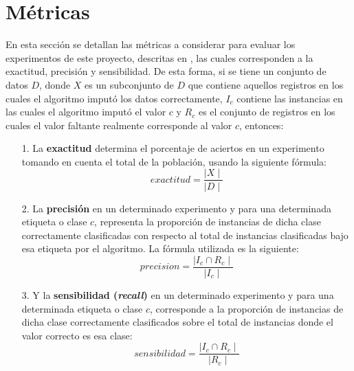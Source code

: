 \section{Métricas}\label{metrics-section}
En esta sección se detallan las métricas a considerar para evaluar los experimentos de este proyecto, descritas en \cite{wang2016non}, las cuales corresponden a la exactitud, precisión y sensibilidad. De esta forma, si se tiene un conjunto de datos $D$, donde $X$ es un subconjunto de $D$ que contiene aquellos registros en los cuales el algoritmo imputó los datos correctamente, $I_{c}$ contiene las instancias en las cuales el algoritmo imputó el valor $c$ y $R_{c}$ es el conjunto de registros en los cuales el valor faltante realmente corresponde al valor $c$, entonces:
\begin{itemize}
\item [1.] La \textbf{exactitud} determina el porcentaje de aciertos en un experimento tomando en cuenta el total de la población, usando la siguiente fórmula:
\begin{equation}
\label{equation-precision}
exactitud = \frac{\mid X \mid}{\mid D \mid} 
\end{equation}

\item [2.] La \textbf{precisión} en un determinado experimento y para una determinada etiqueta o clase $c$, representa la proporción de instancias de dicha clase correctamente clasificadas con respecto al total de instancias clasificadas bajo esa etiqueta por el algoritmo. La fórmula utilizada es la siguiente:
\begin{equation}
\label{equation-accuracy}
precision = \frac{\mid I_{c} \cap R_{c} \mid}{\mid I_{c} \mid}
\end{equation}

\item [3.] Y la \textbf{sensibilidad (\textit{recall})} en un determinado experimento y para una determinada etiqueta o clase $c$, corresponde a la proporción de instancias de dicha clase correctamente clasificados sobre el total de instancias donde el valor correcto es esa clase:
\begin{equation}
\label{equation-recall}
sensibilidad = \frac{\mid I_{c} \cap R_{c} \mid}{\mid R_{c} \mid}
\end{equation}
\end{itemize}
